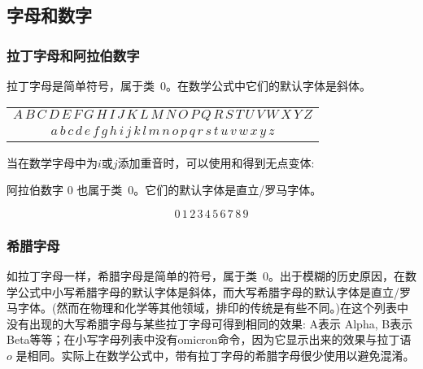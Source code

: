 

\subsection{字母和数字\nopunct}\label{alpha-digit}

\subsubsection{拉丁字母和阿拉伯数字}

拉丁字母是简单符号，属于类~0。在数学公式中它们的默认字体是斜体。

\begin{center}
\begin{tabular}{c}
  $A\,B\,C\,D\,E\,F\,G\,H\,I\,J\,K\,L\,M%
   \,N\,O\,P\,Q\,R\,S\,T\,U\,V\,W\,X\,Y\,Z$\\
  $a\,b\,c\,d\,e\,f\,g\,h\,i\,j\,k\,l\,m%
   \,n\,o\,p\,q\,r\,s\,t\,u\,v\,w\,x\,y\,z$
\end{tabular}
\end{center}
当在数学字母中为$i$或$j$添加重音时，可以使用和得到无点变体:

\begin{symlist}
\symbox{\hat{\jmath}}{\string\hat\string{\string\jmath\string}}
\end{symlist}

阿拉伯数字 0 也属于类~0。它们的默认字体是直立/罗马字体。

\[0\,1\,2\,3\,4\,5\,6\,7\,8\,9\]

\subsubsection{希腊字母}
如拉丁字母一样，希腊字母是简单的符号，属于类~0。出于模糊的历史原因，在数学公式中小写希腊字母的默认字体是斜体，而大写希腊字母的默认字体是直立/罗马字体。(然而在物理和化学等其他领域，排印的传统是有些不同。)在这个列表中没有出现的大写希腊字母与某些拉丁字母可得到相同的效果: A表示 Alpha, B表示Beta等等；在小写字母列表中没有omicron命令，因为它显示出来的效果与拉丁语 $o$ 是相同。实际上在数学公式中，带有拉丁字母的希腊字母很少使用以避免混淆。

